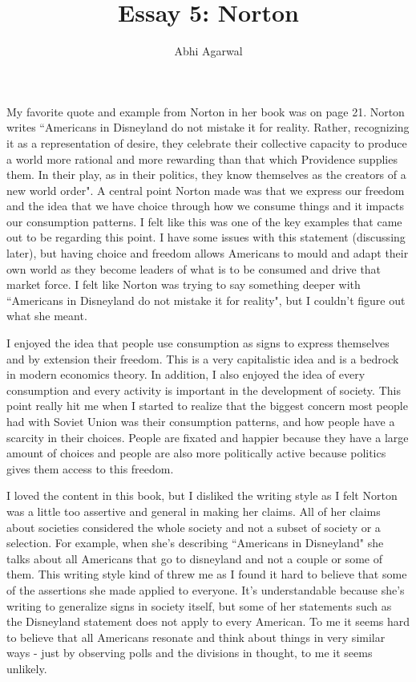 \documentclass[11pt, oneside]{article}
\title{Essay 5: Norton}
\author{Abhi Agarwal}
\date{}
\begin{document}
\maketitle

\par My favorite quote and example from Norton in her book was on page 21. Norton writes ``Americans in Disneyland do not mistake it for reality. Rather, recognizing it as a representation of desire, they celebrate their collective capacity to produce a world more rational and more rewarding than that which Providence supplies them. In their play, as in their politics, they know themselves as the creators of a new world order". A central point Norton made was that we express our freedom and the idea that we have choice through how we consume things and it impacts our consumption patterns. I felt like this was one of the key examples that came out to be regarding this point. I have some issues with this statement (discussing later), but having choice and freedom allows Americans to mould and adapt their own world as they become leaders of what is to be consumed and drive that market force. I felt like Norton was trying to say something deeper with ``Americans in Disneyland do not mistake it for reality", but I couldn't figure out what she meant. 

\par I enjoyed the idea that people use consumption as signs to express themselves and by extension their freedom. This is a very capitalistic idea and is a bedrock in modern economics theory. In addition, I also enjoyed the idea of every consumption and every activity is important in the development of society. This point really hit me when I started to realize that the biggest concern most people had with Soviet Union was their consumption patterns, and how people have a scarcity in their choices. People are fixated and happier because they have a large amount of choices and people are also more politically active because politics gives them access to this freedom. 

\par I loved the content in this book, but I disliked the writing style as I felt Norton was a little too assertive and general in making her claims. All of her claims about societies considered the whole society and not a subset of society or a selection. For example, when she's describing ``Americans in Disneyland" she talks about all Americans that go to disneyland and not a couple or some of them. This writing style kind of threw me as I found it hard to believe that some of the assertions she made applied to everyone. It's understandable because she's writing to generalize signs in society itself, but some of her statements such as the Disneyland statement does not apply to every American. To me it seems hard to believe that all Americans resonate and think about things in very similar ways - just by observing polls and the divisions in thought, to me it seems unlikely. 
\end{document}
